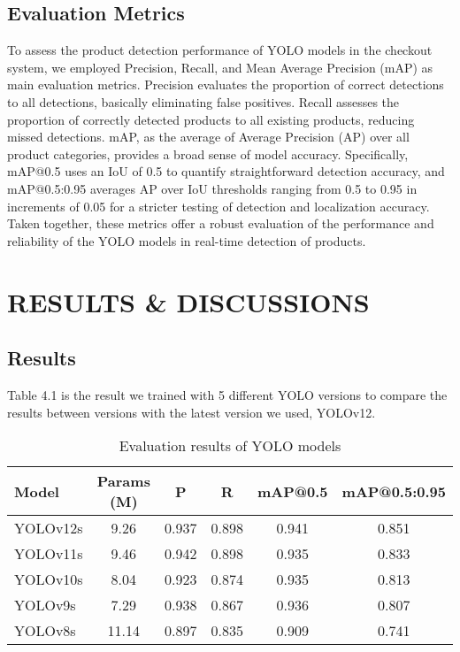 \documentclass[a4paper,13pt]{report}
\begin{document}
\section{Evaluation Metrics}
To assess the product detection performance of YOLO models in the checkout system, we employed Precision, Recall, and Mean Average Precision (mAP) as main evaluation metrics. Precision evaluates the proportion of correct detections to all detections, basically eliminating false positives. Recall assesses the proportion of correctly detected products to all existing products, reducing missed detections. mAP, as the average of Average Precision (AP) over all product categories, provides a broad sense of model accuracy. Specifically, mAP@0.5 uses an IoU of 0.5 to quantify straightforward detection accuracy, and mAP@0.5:0.95 averages AP over IoU thresholds ranging from 0.5 to 0.95 in increments of 0.05 for a stricter testing of detection and localization accuracy. Taken together, these metrics offer a robust evaluation of the performance and reliability of the YOLO models in real-time detection of products.



\clearpage
\chapter{RESULTS \& DISCUSSIONS}
\section{Results}
Table 4.1 is the result we trained with 5 different YOLO versions to compare the results between versions with the latest version we used, YOLOv12.

\begin{table}[H]
    \centering
    \caption{Evaluation results of YOLO models}
    \label{tab:yolo_evaluation}
    \begin{tabular}{lccccc}
        \toprule
        \textbf{Model} & \textbf{Params (M)} & \textbf{P} & \textbf{R} & \textbf{mAP@0.5} & \textbf{mAP@0.5:0.95} \\
        \midrule
        YOLOv12s & 9.26 & 0.937 & 0.898 & 0.941 & 0.851 \\
        YOLOv11s & 9.46 & 0.942 & 0.898 & 0.935 & 0.833 \\
        YOLOv10s & 8.04 & 0.923 & 0.874 & 0.935 & 0.813 \\
        YOLOv9s  & 7.29 & 0.938 & 0.867 & 0.936 & 0.807 \\
        YOLOv8s  & 11.14 & 0.897 & 0.835 & 0.909 & 0.741 \\
        \bottomrule
    \end{tabular}
\end{table}
\end{document}
